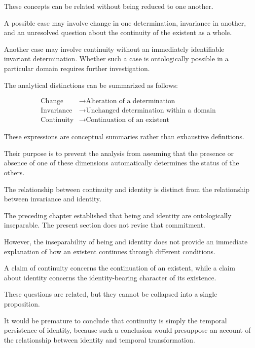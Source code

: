These concepts can be related without
being reduced to one another.

A possible case may involve change
in one determination, invariance in
another, and an unresolved question
about the continuity of the existent
as a whole.

Another case may involve continuity
without an immediately identifiable
invariant determination. Whether
such a case is ontologically possible
in a particular domain requires
further investigation.

The analytical distinctions can
be summarized as follows:

\[
\begin{aligned}
\text{Change} &\rightarrow
\text{Alteration of a determination} \\
\text{Invariance} &\rightarrow
\text{Unchanged determination within a domain} \\
\text{Continuity} &\rightarrow
\text{Continuation of an existent}
\end{aligned}
\]

These expressions are conceptual
summaries rather than exhaustive
definitions.

Their purpose is to prevent the
analysis from assuming that the
presence or absence of one of these
dimensions automatically determines
the status of the others.


The relationship between continuity
and identity is distinct from the
relationship between invariance
and identity.

The preceding chapter established
that being and identity are
ontologically inseparable. The
present section does not revise
that commitment.

However, the inseparability of being
and identity does not provide an
immediate explanation of how an
existent continues through different
conditions.

A claim of continuity concerns the
continuation of an existent, while
a claim about identity concerns
the identity-bearing character
of its existence.

These questions are related, but
they cannot be collapsed into a
single proposition.

It would be premature to conclude
that continuity is simply the
temporal persistence of identity,
because such a conclusion would
presuppose an account of the
relationship between identity
and temporal transformation.

